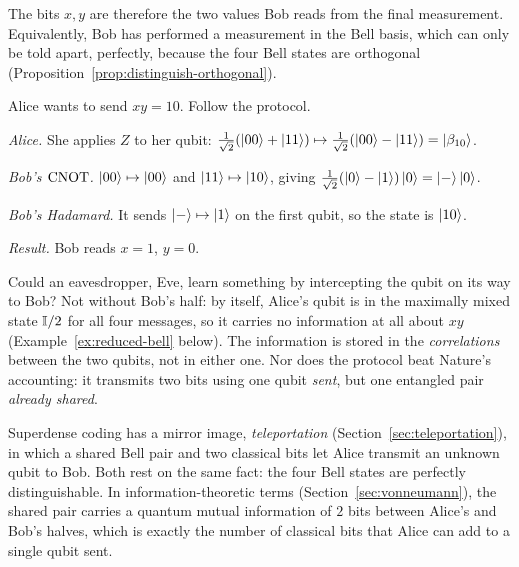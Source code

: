 The bits $x,y$ are therefore the two values Bob reads from the final measurement. Equivalently, Bob has performed a measurement in the Bell basis, which can only be told apart, perfectly, because the four Bell states are orthogonal (Proposition~\ref{prop:distinguish-orthogonal}).

\begin{example}\label{ex:superdense-run}
  Alice wants to send $xy=10$. Follow the protocol.
\end{example}
\begin{solution}
  \begin{steps}
    \item \emph{Alice.} She applies $Z$ to her qubit: $\frac1{\sqrt2}(\left|00\right\rangle+\left|11\right\rangle)\mapsto\frac1{\sqrt2}(\left|00\right\rangle-\left|11\right\rangle)=\left|\beta_{10}\right\rangle$.
    \item \emph{Bob's $\mathrm{CNOT}$.} $\left|00\right\rangle\mapsto\left|00\right\rangle$ and $\left|11\right\rangle\mapsto\left|10\right\rangle$, giving $\frac1{\sqrt2}(\left|0\right\rangle-\left|1\right\rangle)\left|0\right\rangle=\left|-\right\rangle\left|0\right\rangle$.
    \item \emph{Bob's Hadamard.} It sends $\left|-\right\rangle\mapsto\left|1\right\rangle$ on the first qubit, so the state is $\left|10\right\rangle$.
    \item \emph{Result.} Bob reads $x=1$, $y=0$.
  \end{steps}
\end{solution}

\begin{remark}
  Could an eavesdropper, Eve, learn something by intercepting the qubit on its way to Bob? Not without Bob's half: by itself, Alice's qubit is in the maximally mixed state $\mathbb{I}/2$ for all four messages,
  so it carries no information at all about $xy$ (Example~\ref{ex:reduced-bell} below). The information is stored in the \emph{correlations} between the two qubits, not in either one.
  Nor does the protocol beat Nature's accounting: it transmits two bits using one qubit \emph{sent}, but one entangled pair \emph{already shared}.
\end{remark}

\begin{lookahead}
  Superdense coding has a mirror image, \emph{teleportation} (Section~\ref{sec:teleportation}), in which a shared Bell pair and two classical bits let Alice transmit an unknown qubit to Bob. Both rest on the same fact: the four Bell states are perfectly distinguishable. In information-theoretic terms (Section~\ref{sec:vonneumann}), the shared pair carries a quantum mutual information of $2$ bits between Alice's and Bob's halves, which is exactly the number of classical bits that Alice can add to a single qubit sent.
\end{lookahead}

